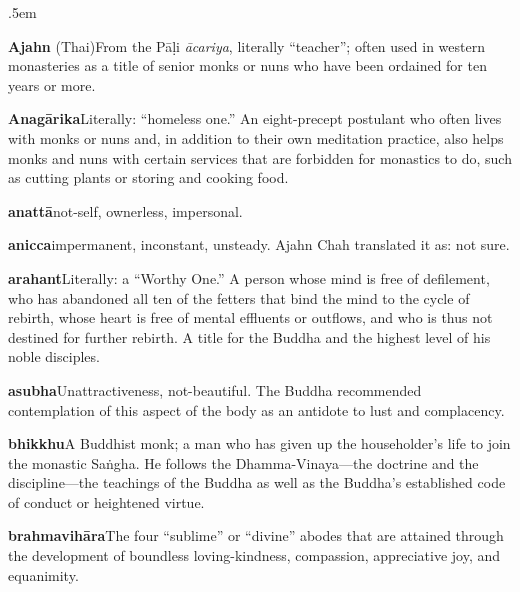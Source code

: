 {\parindent 0pt \parskip .5em
\newcommand{\glosskip}{.6em}

\textbf{Ajahn} (Thai)\hspace{\glosskip}From the Pāḷi \emph{ācariya}, literally 
``teacher''; often used in western monasteries as a title of senior 
monks or nuns who have been ordained for ten years or more.

\textbf{Anagārika}\hspace{\glosskip}Literally: ``homeless one.'' An eight-precept 
postulant who often lives with monks or nuns and, in addition to their 
own meditation practice, also helps monks and nuns with certain 
services that are forbidden for monastics to do, such as cutting plants 
or storing and cooking food.

\textbf{anattā}\hspace{\glosskip}not-self, ownerless, impersonal.

\textbf{anicca}\hspace{\glosskip}impermanent, inconstant, unsteady. Ajahn Chah 
translated it as: not sure.

\textbf{arahant}\hspace{\glosskip}Literally: a ``Worthy One.'' A person whose mind is free 
of defilement, who has abandoned all ten of the fetters that bind the 
mind to the cycle of rebirth, whose heart is free of mental effluents 
or outflows, and who is thus not destined for further rebirth. A title 
for the Buddha and the highest level of his noble disciples.

\textbf{asubha}\hspace{\glosskip}Unattractiveness, not-beautiful. The Buddha recommended 
contemplation of this aspect of the body as an antidote to lust and 
complacency.

\textbf{bhikkhu}\hspace{\glosskip}A Buddhist monk; a man who has given up the 
householder's life to join the monastic Saṅgha. He follows the 
Dhamma-Vinaya---the doctrine and the discipline---the teachings of the 
Buddha as well as the Buddha's established code of conduct or 
heightened virtue.

\textbf{brahmavihāra}\hspace{\glosskip}The four ``sublime'' or ``divine'' abodes that 
are attained through the development of boundless loving-kindness, 
compassion, appreciative joy, and equanimity.

}
